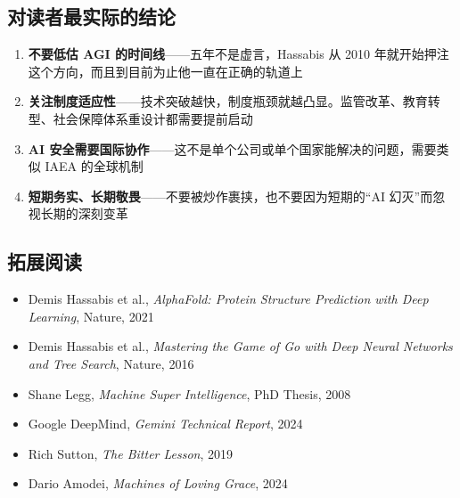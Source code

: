 \subsection{对读者最实际的结论}

\begin{enumerate}
    \item \textbf{不要低估 AGI 的时间线}——五年不是虚言，Hassabis 从 2010 年就开始押注这个方向，而且到目前为止他一直在正确的轨道上
    \item \textbf{关注制度适应性}——技术突破越快，制度瓶颈就越凸显。监管改革、教育转型、社会保障体系重设计都需要提前启动
    \item \textbf{AI 安全需要国际协作}——这不是单个公司或单个国家能解决的问题，需要类似 IAEA 的全球机制
    \item \textbf{短期务实、长期敬畏}——不要被炒作裹挟，也不要因为短期的``AI 幻灭''而忽视长期的深刻变革
\end{enumerate}

\subsection{拓展阅读}

\begin{itemize}
    \item Demis Hassabis et al., \textit{AlphaFold: Protein Structure Prediction with Deep Learning}, Nature, 2021
    \item Demis Hassabis et al., \textit{Mastering the Game of Go with Deep Neural Networks and Tree Search}, Nature, 2016
    \item Shane Legg, \textit{Machine Super Intelligence}, PhD Thesis, 2008
    \item Google DeepMind, \textit{Gemini Technical Report}, 2024
    \item Rich Sutton, \textit{The Bitter Lesson}, 2019
    \item Dario Amodei, \textit{Machines of Loving Grace}, 2024
\end{itemize}


